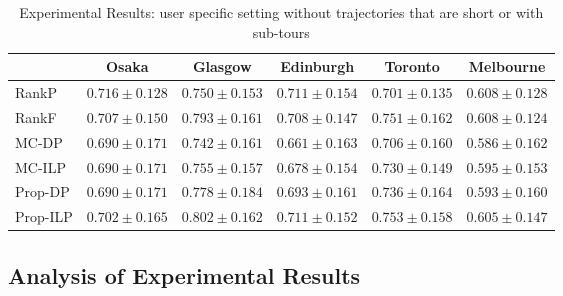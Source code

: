 \begin{table*}
    \centering
    \caption{Experimental Results: user specific setting without trajectories that are short or with sub-tours}
    \begin{tabular}{l|ccccc} \hline
         & Osaka & Glasgow & Edinburgh & Toronto & Melbourne \\ \hline
        RankP & $\mathbf{0.716\pm0.128}$ & $0.750\pm0.153$ & $\mathbf{0.711\pm0.154}$ & $0.701\pm0.135$ & $0.608\pm0.128$ \\
        RankF & $0.707\pm0.150$ & $0.793\pm0.161$ & $0.708\pm0.147$ & $0.751\pm0.162$ & $\mathbf{0.608\pm0.124}$ \\
        MC-DP & $0.690\pm0.171$ & $0.742\pm0.161$ & $0.661\pm0.163$ & $0.706\pm0.160$ & $0.586\pm0.162$ \\
        MC-ILP & $0.690\pm0.171$ & $0.755\pm0.157$ & $0.678\pm0.154$ & $0.730\pm0.149$ & $0.595\pm0.153$ \\
        Prop-DP & $0.690\pm0.171$ & $0.778\pm0.184$ & $0.693\pm0.161$ & $0.736\pm0.164$ & $0.593\pm0.160$ \\
        Prop-ILP & $0.702\pm0.165$ & $\mathbf{0.802\pm0.162}$ & $0.711\pm0.152$ & $\mathbf{0.753\pm0.158}$ & $0.605\pm0.147$ \\
        \hline
    \end{tabular}
\end{table*}


\subsection{Analysis of Experimental Results}
\label{experiment:analysis}
